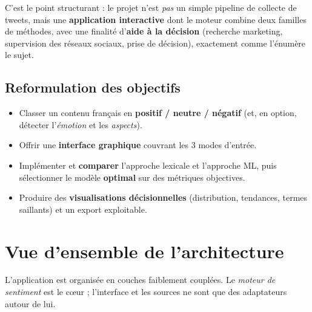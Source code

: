 \documentclass[11pt,a4paper]{article}
\begin{document}
C'est le point structurant : le projet n'est \emph{pas} un simple pipeline de
collecte de tweets, mais une \textbf{application interactive} dont le moteur
combine deux familles de méthodes, avec une finalité d'\textbf{aide à la
décision} (recherche marketing, supervision des réseaux sociaux, prise de
décision), exactement comme l'énumère le sujet.

\subsection{Reformulation des objectifs}
\begin{itemize}[leftmargin=1.2cm,nosep]
  \item Classer un contenu français en \textbf{positif / neutre / négatif}
        (et, en option, détecter l'\emph{émotion} et les \emph{aspects}).
  \item Offrir une \textbf{interface graphique} couvrant les 3 modes d'entrée.
  \item Implémenter et \textbf{comparer} l'approche lexicale et l'approche ML,
        puis sélectionner le modèle \textbf{optimal} sur des métriques objectives.
  \item Produire des \textbf{visualisations décisionnelles} (distribution,
        tendances, termes saillants) et un export exploitable.
\end{itemize}

\section{Vue d'ensemble de l'architecture}

L'application est organisée en couches faiblement couplées. Le \emph{moteur de
sentiment} est le c\oe ur ; l'interface et les sources ne sont que des
adaptateurs autour de lui.
\end{document}

